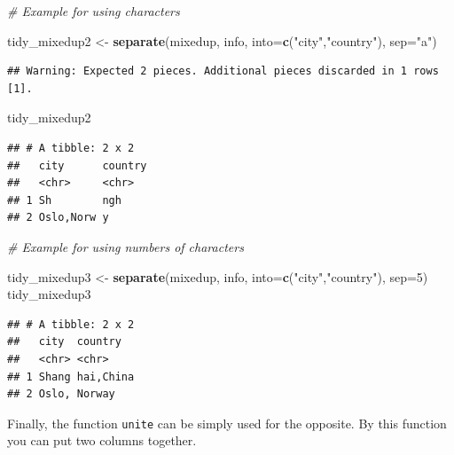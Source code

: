 \documentclass[]{report}
\newenvironment{Shaded}{\begin{snugshade}}{\end{snugshade}}
\newcommand{\KeywordTok}[1]{\textcolor[rgb]{0.13,0.29,0.53}{\textbf{#1}}}
\newcommand{\DataTypeTok}[1]{\textcolor[rgb]{0.13,0.29,0.53}{#1}}
\newcommand{\DecValTok}[1]{\textcolor[rgb]{0.00,0.00,0.81}{#1}}
\newcommand{\StringTok}[1]{\textcolor[rgb]{0.31,0.60,0.02}{#1}}
\newcommand{\CommentTok}[1]{\textcolor[rgb]{0.56,0.35,0.01}{\textit{#1}}}
\newcommand{\NormalTok}[1]{#1}
\begin{document}
\begin{Shaded}
\begin{Highlighting}[]
\CommentTok{# Example for using characters}

\NormalTok{tidy_mixedup2 <-}\StringTok{ }\KeywordTok{separate}\NormalTok{(mixedup,}
\NormalTok{                          info,}
                          \DataTypeTok{into=}\KeywordTok{c}\NormalTok{(}\StringTok{"city"}\NormalTok{,}\StringTok{"country"}\NormalTok{),}
                          \DataTypeTok{sep=}\StringTok{"a"}\NormalTok{)}
\end{Highlighting}
\end{Shaded}

\begin{verbatim}
## Warning: Expected 2 pieces. Additional pieces discarded in 1 rows [1].
\end{verbatim}

\begin{Shaded}
\begin{Highlighting}[]
\NormalTok{tidy_mixedup2}
\end{Highlighting}
\end{Shaded}

\begin{verbatim}
## # A tibble: 2 x 2
##   city      country
##   <chr>     <chr>  
## 1 Sh        ngh    
## 2 Oslo,Norw y
\end{verbatim}

\begin{Shaded}
\begin{Highlighting}[]
\CommentTok{# Example for using numbers of characters}

\NormalTok{tidy_mixedup3 <-}\StringTok{ }\KeywordTok{separate}\NormalTok{(mixedup,}
\NormalTok{                          info,}
                          \DataTypeTok{into=}\KeywordTok{c}\NormalTok{(}\StringTok{"city"}\NormalTok{,}\StringTok{"country"}\NormalTok{),}
                          \DataTypeTok{sep=}\DecValTok{5}\NormalTok{)}
\NormalTok{tidy_mixedup3}
\end{Highlighting}
\end{Shaded}

\begin{verbatim}
## # A tibble: 2 x 2
##   city  country  
##   <chr> <chr>    
## 1 Shang hai,China
## 2 Oslo, Norway
\end{verbatim}

Finally, the function \texttt{unite} can be simply used for the
opposite. By this function you can put two columns together.
\end{document}
